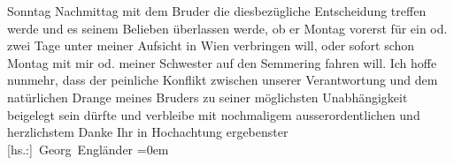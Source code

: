 \begin{ledgroupsized}[t]{13cm}
                  Sonntag{ }{\pb}Nachmittag mit dem Bruder die diesbezügliche Entscheidung treffen werde und es
               seinem Belieben überlassen werde, ob er Montag vorerst für ein od. zwei
               Tage unter meiner Aufsicht in Wien verbringen
               will, oder sofort schon Montag mit mir od. meiner Schwester auf den Semmering fahren will.\pend
           \pstart
           Ich hoffe nunmehr, dass der peinliche Konflikt zwischen unserer Verantwortung und dem
               natürlichen Drange meines Bruders zu seiner möglichsten Unabhängigkeit beigelegt sein dürfte und
               verbleibe mit nochmaligem ausserordentlichen und herzlichstem Danke Ihr in\pend
           \pstart
           Hochachtung ergebenster{\\[\baselineskip]}\spacefill\mbox{{[}hs.:{]} Georg Engländer}\pend
           \leftskip=0em{}
         
         \endnumbering{}\end{ledgroupsized}  \newcommand{\dateiname}{L02131}\newcommand{\titel}{Georg Engländer an Arthur Schnitzler, 25. 4. 1913}\newcommand{\editorInnen}{Martin Anton Müller und Gerd-Hermann Susen}
      